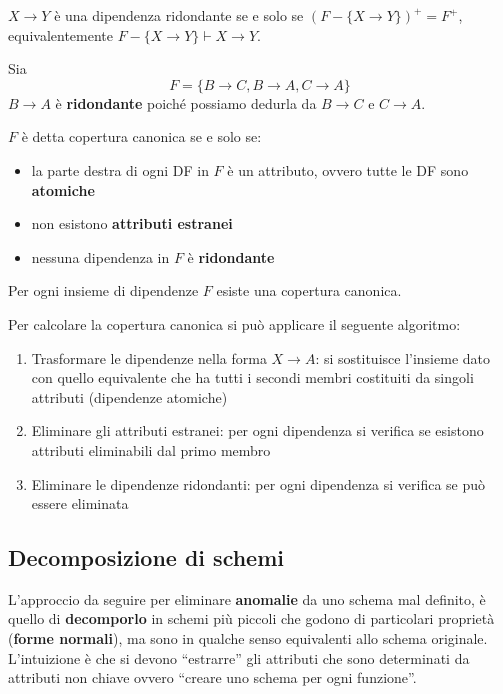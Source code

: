 \begin{definition}
	$X \to Y$ è una dipendenza ridondante se e solo se $(F - \{X \to Y\})^+ = F ^+$, equivalentemente $F - \{X \to Y\} \vdash X \to Y$.
\end{definition}

\begin{example}
	Sia
	\begin{equation*}
		F = \{B \to C, B \to A, C \to A\}
	\end{equation*}
	$B \to A$ è \textbf{ridondante} poiché possiamo dedurla da $B \to C$ e $C \to A$.
\end{example}

\newpage
\begin{definition}
	$F$ è detta copertura canonica se e solo se:
	\begin{itemize}
		\item la parte destra di ogni DF in $F$ è un attributo, ovvero tutte le DF sono \textbf{atomiche}
		\item non esistono \textbf{attributi estranei}
		\item nessuna dipendenza in $F$ è \textbf{ridondante}
	\end{itemize}
\end{definition}

\begin{theorem}
	Per ogni insieme di dipendenze $F$ esiste una copertura canonica.
\end{theorem}

Per calcolare la copertura canonica si può applicare il seguente algoritmo:
\begin{enumerate}
	\item Trasformare le dipendenze nella forma $X \to A$: si sostituisce l’insieme dato con quello equivalente che ha tutti i secondi membri costituiti da singoli attributi (dipendenze atomiche)
	\item Eliminare gli attributi estranei: per ogni dipendenza si verifica se esistono attributi eliminabili dal primo membro
	\item Eliminare le dipendenze ridondanti: per ogni dipendenza si verifica se può essere eliminata
\end{enumerate}

\subsection{Decomposizione di schemi}
L’approccio da seguire per eliminare \textbf{anomalie} da uno schema mal definito, è quello di \textbf{decomporlo} in schemi più piccoli che godono di particolari proprietà (\textbf{forme normali}), ma sono in qualche senso equivalenti allo schema originale. L’intuizione è che si devono “estrarre” gli attributi che sono determinati da attributi non chiave ovvero “creare uno schema per ogni funzione”.\\

